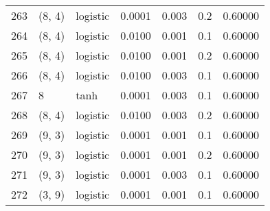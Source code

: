 \begin{tabular}{lllrrrr}
263 &      (8, 4) &  logistic &  0.0001 &  0.003 &  0.2 &   0.60000 \\
264 &      (8, 4) &  logistic &  0.0100 &  0.001 &  0.1 &   0.60000 \\
265 &      (8, 4) &  logistic &  0.0100 &  0.001 &  0.2 &   0.60000 \\
266 &      (8, 4) &  logistic &  0.0100 &  0.003 &  0.1 &   0.60000 \\
267 &           8 &      tanh &  0.0001 &  0.003 &  0.1 &   0.60000 \\
268 &      (8, 4) &  logistic &  0.0100 &  0.003 &  0.2 &   0.60000 \\
269 &      (9, 3) &  logistic &  0.0001 &  0.001 &  0.1 &   0.60000 \\
270 &      (9, 3) &  logistic &  0.0001 &  0.001 &  0.2 &   0.60000 \\
271 &      (9, 3) &  logistic &  0.0001 &  0.003 &  0.1 &   0.60000 \\
272 &      (3, 9) &  logistic &  0.0001 &  0.001 &  0.1 &   0.60000 \\
\bottomrule
\end{tabular}

